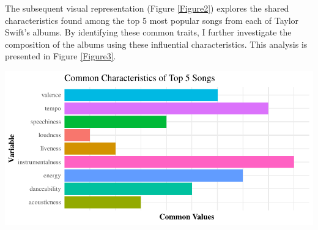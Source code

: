\documentclass[11pt,preprint, authoryear]{elsarticle}
\let\origfigure\figure
\let\endorigfigure\endfigure
\renewenvironment{figure}[1][2] {
    \expandafter\origfigure\expandafter[H]
} {
    \endorigfigure
}
\numberwithin{equation}{section}
\numberwithin{figure}{section}
\numberwithin{table}{section}
\begin{document}
The subsequent visual representation (Figure \ref{Figure2}) explores the
shared characteristics found among the top 5 most popular songs from
each of Taylor Swift's albums. By identifying these common traits, I
further investigate the composition of the albums using these
influential characteristics. This analysis is presented in Figure
\ref{Figure3}.

\begin{figure}[H]

{\centering \includegraphics{Taylor-Swift-Report_files/figure-latex/Figure2-1} 

}

\caption{Common Characteristics of Top 5 Songs \label{Figure2}}\label{fig:Figure2}
\end{figure}
\end{document}
